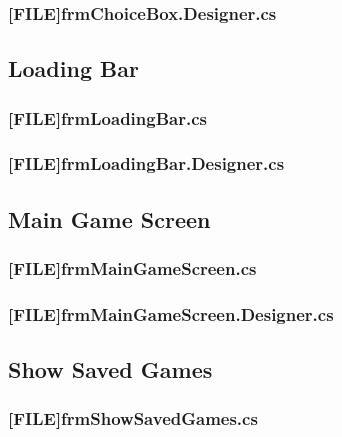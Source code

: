\subsubsection{[FILE]frmChoiceBox.Designer.cs}


\subsection{Loading Bar}
\subsubsection{[FILE]frmLoadingBar.cs}

\subsubsection{[FILE]frmLoadingBar.Designer.cs}


\subsection{Main Game Screen}
\subsubsection{[FILE]frmMainGameScreen.cs}

\subsubsection{[FILE]frmMainGameScreen.Designer.cs}


\subsection{Show Saved Games}
\subsubsection{[FILE]frmShowSavedGames.cs}

